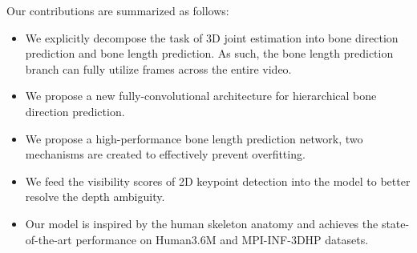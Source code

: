 \documentclass[journal]{IEEEtran}
\begin{document}
Our contributions are summarized as follows: 
\begin{itemize}
\vspace{-2mm}
    \item We explicitly decompose the task of 3D joint estimation into bone direction prediction and bone length prediction. As such, the bone length prediction branch can fully utilize frames across the entire video. 
    \item We propose a new fully-convolutional architecture for hierarchical bone direction prediction.
    \item We propose a high-performance bone length prediction network, two mechanisms are created to effectively prevent overfitting.
    \item We feed the visibility scores of 2D keypoint detection into the model to better resolve the depth ambiguity. 
    \item Our model is inspired by the human skeleton anatomy and achieves the state-of-the-art performance on Human3.6M and MPI-INF-3DHP datasets.
\end{itemize}
\end{document}
